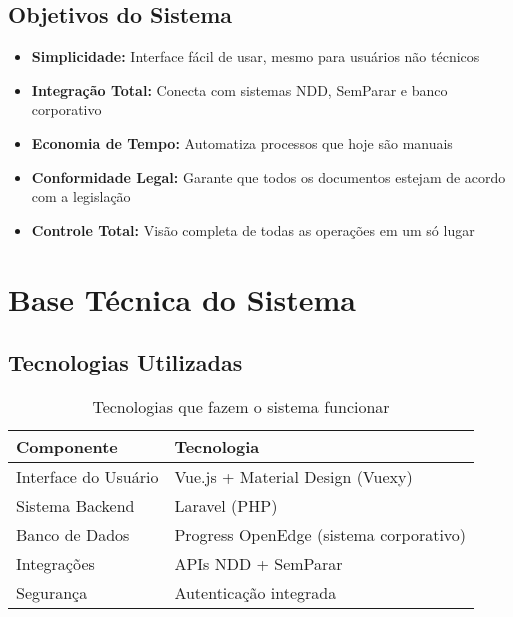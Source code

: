 \documentclass[12pt,a4paper]{article}
\begin{document}
\subsection{Objetivos do Sistema}
\begin{itemize}[leftmargin=2cm]
    \item \textbf{Simplicidade:} Interface fácil de usar, mesmo para usuários não técnicos
    \item \textbf{Integração Total:} Conecta com sistemas NDD, SemParar e banco corporativo
    \item \textbf{Economia de Tempo:} Automatiza processos que hoje são manuais
    \item \textbf{Conformidade Legal:} Garante que todos os documentos estejam de acordo com a legislação
    \item \textbf{Controle Total:} Visão completa de todas as operações em um só lugar
\end{itemize}

\section{Base Técnica do Sistema}

\subsection{Tecnologias Utilizadas}
\begin{table}[H]
    \centering
    \begin{tabularx}{\textwidth}{|X|X|}
        \hline
        \textbf{Componente} & \textbf{Tecnologia} \\
        \hline
        Interface do Usuário & Vue.js + Material Design (Vuexy) \\
        Sistema Backend & Laravel (PHP) \\
        Banco de Dados & Progress OpenEdge (sistema corporativo) \\
        Integrações & APIs NDD + SemParar \\
        Segurança & Autenticação integrada \\
        \hline
    \end{tabularx}
    \caption{Tecnologias que fazem o sistema funcionar}
\end{table}
\end{document}

